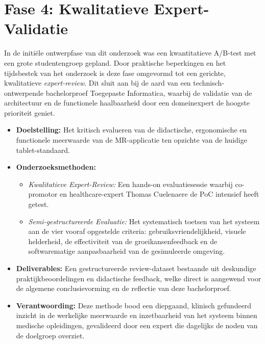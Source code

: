 \section{Fase 4: Kwalitatieve Expert-Validatie}
In de initiële ontwerpfase van dit onderzoek was een kwantitatieve A/B-test met een grote studentengroep gepland. 
Door praktische beperkingen en het tijdsbestek van het onderzoek is deze fase omgevormd tot een gerichte, kwalitatieve \textit{expert-review}. 
Dit sluit aan bij de aard van een technisch-ontwerpende bachelorproef Toegepaste Informatica, waarbij de validatie van de architectuur en de functionele 
haalbaarheid door een domeinexpert de hoogste prioriteit geniet.
\begin{itemize}
    \item \textbf{Doelstelling:} Het kritisch evalueren van de didactische, ergonomische en functionele meerwaarde van de MR-applicatie ten opzichte van de 
    huidige tablet-standaard.
    \item \textbf{Onderzoeksmethoden:} 
        \begin{itemize}
            \item \textit{Kwalitatieve Expert-Review:} Een hands-on evaluatiesessie waarbij co-promotor en healthcare-expert Thomas Cuelenaere de PoC 
            intensief heeft getest.
            \item \textit{Semi-gestructureerde Evaluatie:} Het systematisch toetsen van het systeem aan de vier vooraf opgestelde criteria: gebruiksvriendelijkheid, 
            visuele helderheid, de effectiviteit van de groeikansenfeedback en de softwarematige aanpasbaarheid van de gesimuleerde omgeving.
        \end{itemize}
    \item \textbf{Deliverables:} Een gestructureerde review-dataset bestaande uit deskundige praktijkbeoordelingen en didactische feedback, welke direct is aangewend 
    voor de algemene conclusievorming en de reflectie van deze bachelorproef.
    \item \textbf{Verantwoording:} Deze methode bood een diepgaand, klinisch gefundeerd inzicht in de werkelijke meerwaarde en inzetbaarheid van het systeem binnen 
    medische opleidingen, gevalideerd door een expert die dagelijks de noden van de doelgroep overziet.
\end{itemize}


